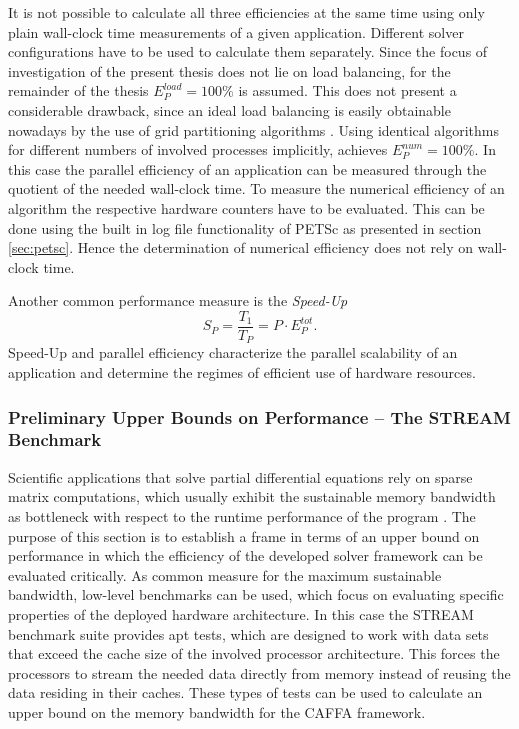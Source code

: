 It is not possible to calculate all three efficiencies at the same time using only plain wall-clock time measurements of a given application.  Different solver configurations have to be used to calculate them separately. Since the focus of investigation of the present thesis does not lie on load balancing, for the remainder of the thesis \(E^{load}_P = 100\%  \) is assumed. This does not present a considerable drawback, since an ideal load balancing is easily obtainable nowadays by the use of grid partitioning algorithms \cite{ferziger02}. Using identical algorithms for different numbers of involved processes implicitly, achieves \(E^{num}_P = 100 \%\). In this case the parallel efficiency of an application can be measured through the quotient of the needed wall-clock time. To measure the numerical efficiency of an algorithm the respective hardware counters have to be evaluated. This can be done using the built in log file functionality of PETSc as presented in section \ref{sec:petsc}. Hence the determination of numerical efficiency does not rely on wall-clock time.

Another common performance measure is the \emph{Speed-Up}
\begin{displaymath}
  S_P = \frac{T_1}{T_P} = P \cdot E^{tot}_P.
\end{displaymath}
Speed-Up and parallel efficiency characterize the parallel scalability of an application and determine the regimes of efficient use of hardware resources.

\subsubsection{Preliminary Upper Bounds on Performance -- The STREAM Benchmark}

Scientific applications that solve partial differential equations rely on sparse matrix computations, which usually exhibit the sustainable memory bandwidth as bottleneck with respect to the runtime performance of the program \cite{hager11}. The purpose of this section is to establish a frame in terms of an upper bound on performance in which the efficiency of the developed solver framework can be evaluated critically. As common measure for the maximum sustainable bandwidth, low-level benchmarks can be used, which focus on evaluating specific properties of the deployed hardware architecture. In this case the STREAM benchmark suite \cite{mccalpin07,mccalpin95} provides apt tests, which are designed to work with data sets that exceed the cache size of the involved processor architecture. This forces the processors to stream the needed data directly from memory instead of reusing the data residing in their caches. These types of tests can be used to calculate an upper bound on the memory bandwidth for the CAFFA framework.

